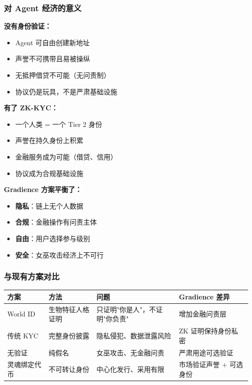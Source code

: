 \documentclass[11pt,a4paper]{article}
\begin{document}
\subsubsection{对 Agent 经济的意义}

\textbf{没有身份验证：}
\begin{itemize}[leftmargin=2em]
\item Agent 可自由创建新地址
\item 声誉不可携带且易被操纵
\item 无抵押借贷不可能（无问责制）
\item 协议仍是玩具，不是严肃基础设施
\end{itemize}

\textbf{有了 ZK-KYC：}
\begin{itemize}[leftmargin=2em]
\item 一个人类 = 一个 Tier 2 身份
\item 声誉在持久身份上积累
\item 金融服务成为可能（借贷、信用）
\item 协议成为合规基础设施
\end{itemize}

\textbf{Gradience 方案平衡了：}
\begin{itemize}[leftmargin=2em]
\item \textbf{隐私}：链上无个人数据
\item \textbf{合规}：金融操作有问责主体
\item \textbf{自由}：用户选择参与级别
\item \textbf{安全}：女巫攻击经济上不可行
\end{itemize}

\subsubsection{与现有方案对比}

\begin{table}[H]\centering
\begin{tabular}{@{}llll@{}}
\toprule
\textbf{方案} & \textbf{方法} & \textbf{问题} & \textbf{Gradience 差异} \\
\midrule
World ID & 生物特征人格证明 & 只证明"你是人"，不证明"你负责" & 增加金融问责层 \\
传统 KYC & 完整身份披露 & 隐私侵犯、数据泄露风险 & ZK 证明保持身份私密 \\
无验证 & 纯假名 & 女巫攻击、无金融问责 & 严肃用途可选验证 \\
灵魂绑定代币 & 不可转让身份 & 中心化发行、采用有限 & 市场验证声誉 + 可选身份 \\
\bottomrule
\end{tabular}
\end{table}
\end{document}
